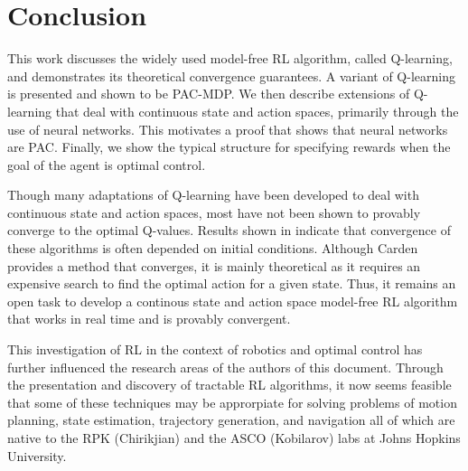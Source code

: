 \documentclass{article} %
\begin{document}
\section{Conclusion}
This work discusses the widely used model-free RL algorithm, called Q-learning, and demonstrates its theoretical convergence guarantees.  A variant of Q-learning is presented and shown to be PAC-MDP.  We then describe extensions of Q-learning that deal with continuous state and action spaces, primarily through the use of neural networks.  This motivates a proof that shows that neural networks are PAC.  Finally, we show the typical structure for specifying rewards when the goal of the agent is optimal control.  

Though many adaptations of Q-learning have been developed to deal with continuous state and action spaces, most have not been shown to provably converge to the optimal Q-values.  Results shown in \cite{gaskett_thesis} indicate that convergence of these algorithms is often depended on initial conditions.  Although Carden provides a method that converges, it is mainly theoretical as it requires an expensive search to find the optimal action for a given state.  Thus, it remains an open task to develop a continous state and action space model-free RL algorithm that works in real time and is provably convergent.  
  
This investigation of RL in the context of robotics and optimal control has further influenced the research areas of the authors of this document. Through the presentation and discovery of tractable RL algorithms, it now seems feasible that some of these techniques may be approrpiate for solving problems of motion planning, state estimation, trajectory generation, and navigation all of which are native to the RPK (Chirikjian) and the ASCO (Kobilarov) labs at Johns Hopkins University.  


\nocite{yang_multiagent_2004}
\nocite{kim_autonomous_2003}

\newpage
{}





\end{document}
